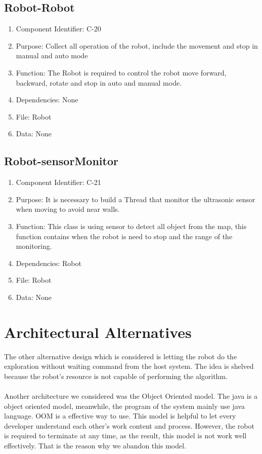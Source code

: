 \documentclass[11pt, a4paper]{report}
\begin{document}
\subsection{Robot-Robot}
\begin{enumerate}
\item Component Identifier: C-20
\item Purpose: Collect all operation of the robot, include the movement and stop in manual and auto mode
\item Function: The Robot is required to control the robot move forward, backward, rotate and stop in auto and manual mode.
\item Dependencies: None
\item File: Robot
\item Data: None
\end{enumerate}

\subsection{Robot-sensorMonitor}
\begin{enumerate}
\item Component Identifier: C-21
\item Purpose: It is necessary to build  a Thread that monitor the ultrasonic sensor when moving to avoid near walls. 
 \item Function: This class is using sensor to detect all object from the map, this function contains when the robot is need to stop and the range of the monitoring.
\item Dependencies: Robot
\item File: Robot
\item Data: None
\end{enumerate}



\section{Architectural Alternatives}
The other alternative design which is considered is letting the robot do the exploration without
waiting command from the host system. The idea is shelved because the robot's resource is not capable
of performing the  algorithm.\\ \\
Another architecture we considered was the Object Oriented model. The java is a object oriented model, meanwhile, the program of the system mainly use java language. OOM is a effective way to use. This model is helpful to let every developer understand each other's work content and process. However, the robot is required to terminate at any time, as the result, this model is not work well effectively. That is the reason why we abandon this model.
\end{document}

